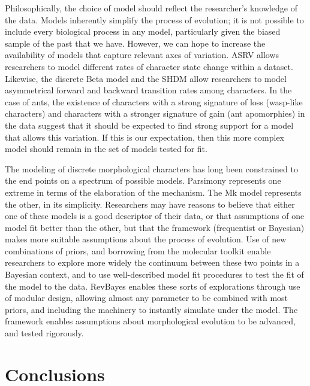 \documentclass[]{sysbio}
\begin{document}
Philosophically, the choice of model should reflect the researcher's knowledge of the data. 
Models inherently simplify the process of evolution; it is not possible to include every biological process in any model, particularly given the biased sample of the past that we have.
However, we can hope to increase the availability of models that capture relevant axes of variation. 
ASRV allows researchers to model different rates of character state change within a dataset.
Likewise, the discrete Beta model and the SHDM allow researchers to model asymmetrical forward and backward transition rates among characters. 
In the case of ants, the existence of characters with a strong signature of loss (wasp-like characters) and characters with a stronger signature of gain (ant apomorphies) in the data suggest that it should be expected to find strong support for a model that allows this variation.
If this is our expectation, then this more complex model should remain in the set of models tested for fit. \par
The modeling of discrete morphological characters has long been constrained to the end points on a spectrum of possible models. 
Parsimony represents one extreme in terms of the elaboration of the mechanism. 
The Mk model represents the other, in its simplicity.
Researchers may have reasons to believe that either one of these models is a good descriptor of their data, or that assumptions of one model fit better than the other, but that the framework (frequentist or Bayesian) makes more suitable assumptions about the process of evolution.
Use of new combinations of priors, and borrowing from the molecular toolkit enable researchers to explore more widely the continuum between these two points in a Bayesian context, and to use well-described model fit procedures to test the fit of the model to the data.
RevBayes enables these sorts of explorations through use of modular design, allowing almost any parameter to be combined with most priors, and including the machinery to instantly simulate under the model.
The framework enables assumptions about morphological evolution to be advanced, and tested rigorously.
 \par

\section{Conclusions}
\end{document}
